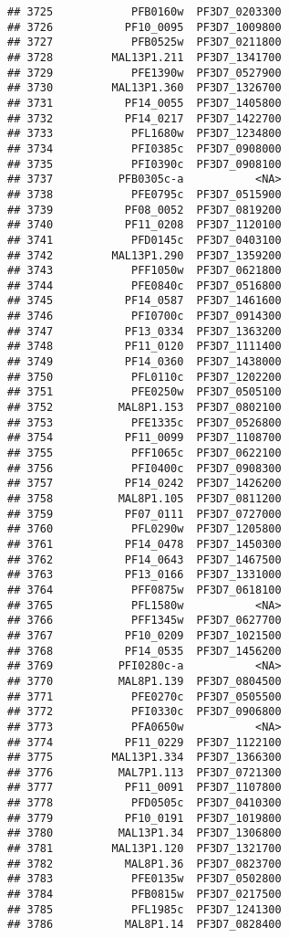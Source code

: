 \documentclass{article}\usepackage[]{graphicx}\usepackage[]{color}
\makeatletter
\newenvironment{kframe}{%
 \def\at@end@of@kframe{}%
 \ifinner\ifhmode%
  \def\at@end@of@kframe{\end{minipage}}%
  \begin{minipage}{\columnwidth}%
 \fi\fi%
 \def\FrameCommand##1{\hskip\@totalleftmargin \hskip-\fboxsep
 \colorbox{shadecolor}{##1}\hskip-\fboxsep
     \hskip-\linewidth \hskip-\@totalleftmargin \hskip\columnwidth}%
 \MakeFramed {\advance\hsize-\width
   \@totalleftmargin\z@ \linewidth\hsize
   \@setminipage}}%
 {\par\unskip\endMakeFramed%
 \at@end@of@kframe}
\newenvironment{knitrout}{}{} %
\makeatother
\begin{document}
\begin{knitrout}
\begin{kframe}
\begin{verbatim}
## 3725            PFB0160w  PF3D7_0203300
## 3726           PF10_0095  PF3D7_1009800
## 3727            PFB0525w  PF3D7_0211800
## 3728         MAL13P1.211  PF3D7_1341700
## 3729            PFE1390w  PF3D7_0527900
## 3730         MAL13P1.360  PF3D7_1326700
## 3731           PF14_0055  PF3D7_1405800
## 3732           PF14_0217  PF3D7_1422700
## 3733            PFL1680w  PF3D7_1234800
## 3734            PFI0385c  PF3D7_0908000
## 3735            PFI0390c  PF3D7_0908100
## 3737          PFB0305c-a           <NA>
## 3738            PFE0795c  PF3D7_0515900
## 3739           PF08_0052  PF3D7_0819200
## 3740           PF11_0208  PF3D7_1120100
## 3741            PFD0145c  PF3D7_0403100
## 3742         MAL13P1.290  PF3D7_1359200
## 3743            PFF1050w  PF3D7_0621800
## 3744            PFE0840c  PF3D7_0516800
## 3745           PF14_0587  PF3D7_1461600
## 3746            PFI0700c  PF3D7_0914300
## 3747           PF13_0334  PF3D7_1363200
## 3748           PF11_0120  PF3D7_1111400
## 3749           PF14_0360  PF3D7_1438000
## 3750            PFL0110c  PF3D7_1202200
## 3751            PFE0250w  PF3D7_0505100
## 3752          MAL8P1.153  PF3D7_0802100
## 3753            PFE1335c  PF3D7_0526800
## 3754           PF11_0099  PF3D7_1108700
## 3755            PFF1065c  PF3D7_0622100
## 3756            PFI0400c  PF3D7_0908300
## 3757           PF14_0242  PF3D7_1426200
## 3758          MAL8P1.105  PF3D7_0811200
## 3759           PF07_0111  PF3D7_0727000
## 3760            PFL0290w  PF3D7_1205800
## 3761           PF14_0478  PF3D7_1450300
## 3762           PF14_0643  PF3D7_1467500
## 3763           PF13_0166  PF3D7_1331000
## 3764            PFF0875w  PF3D7_0618100
## 3765            PFL1580w           <NA>
## 3766            PFF1345w  PF3D7_0627700
## 3767           PF10_0209  PF3D7_1021500
## 3768           PF14_0535  PF3D7_1456200
## 3769          PFI0280c-a           <NA>
## 3770          MAL8P1.139  PF3D7_0804500
## 3771            PFE0270c  PF3D7_0505500
## 3772            PFI0330c  PF3D7_0906800
## 3773            PFA0650w           <NA>
## 3774           PF11_0229  PF3D7_1122100
## 3775         MAL13P1.334  PF3D7_1366300
## 3776          MAL7P1.113  PF3D7_0721300
## 3777           PF11_0091  PF3D7_1107800
## 3778            PFD0505c  PF3D7_0410300
## 3779           PF10_0191  PF3D7_1019800
## 3780          MAL13P1.34  PF3D7_1306800
## 3781         MAL13P1.120  PF3D7_1321700
## 3782           MAL8P1.36  PF3D7_0823700
## 3783            PFE0135w  PF3D7_0502800
## 3784            PFB0815w  PF3D7_0217500
## 3785            PFL1985c  PF3D7_1241300
## 3786           MAL8P1.14  PF3D7_0828400

\end{verbatim}
\end{kframe}
\end{knitrout}
\end{document}
